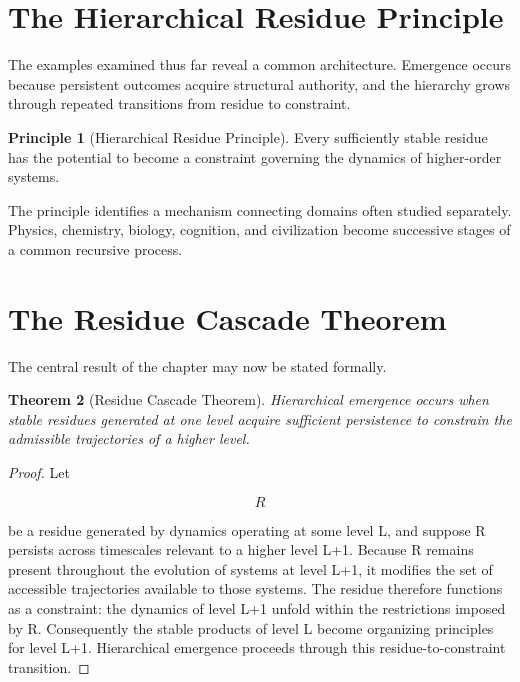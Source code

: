 \documentclass[11pt,oneside]{book}
\theoremstyle{plain}
\newtheorem{theorem}{Theorem}[chapter]
\theoremstyle{definition}
\newtheorem{principle}[theorem]{Principle}
\theoremstyle{remark}
\begin{document}
\section{The Hierarchical Residue Principle}

The examples examined thus far reveal a common architecture. Emergence occurs because persistent outcomes acquire structural authority, and the hierarchy grows through repeated transitions from residue to constraint.

\begin{principle}[Hierarchical Residue Principle]
Every sufficiently stable residue has the potential to become a constraint governing the dynamics of higher-order systems.
\end{principle}

The principle identifies a mechanism connecting domains often studied separately. Physics, chemistry, biology, cognition, and civilization become successive stages of a common recursive process.

\section{The Residue Cascade Theorem}

The central result of the chapter may now be stated formally.

\begin{theorem}[Residue Cascade Theorem]
Hierarchical emergence occurs when stable residues generated at one level acquire sufficient persistence to constrain the admissible trajectories of a higher level.
\end{theorem}

\begin{proof}
Let

\begin{equation}
R
\end{equation}

be a residue generated by dynamics operating at some level L, and suppose R persists across timescales relevant to a higher level L+1. Because R remains present throughout the evolution of systems at level L+1, it modifies the set of accessible trajectories available to those systems. The residue therefore functions as a constraint: the dynamics of level L+1 unfold within the restrictions imposed by R. Consequently the stable products of level L become organizing principles for level L+1. Hierarchical emergence proceeds through this residue-to-constraint transition.
\end{proof}
\end{document}
